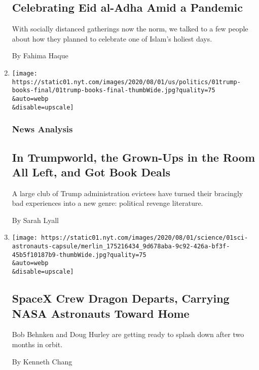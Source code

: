 \begin{enumerate}
  \hypertarget{celebrating-eid-al-adha-amid-a-pandemic-1}{%
  \subsection{Celebrating Eid al-Adha Amid a
  Pandemic}\label{celebrating-eid-al-adha-amid-a-pandemic-1}}

  With socially distanced gatherings now the norm, we talked to a few
  people about how they planned to celebrate one of Islam's holiest
  days.

  By Fahima Haque
\item
  \href{/2020/08/01/us/politics/trump-books.html}{}

  \texttt{[image: https://static01.nyt.com/images/2020/08/01/us/politics/01trump-books-final/01trump-books-final-thumbWide.jpg?quality=75\\\&auto=webp\\\&disable=upscale]}

  \hypertarget{news-analysis}{%
  \subsubsection{News Analysis}\label{news-analysis}}

  \hypertarget{in-trumpworld-the-grown-ups-in-the-room-all-left-and-got-book-deals}{%
  \subsection{In Trumpworld, the Grown-Ups in the Room All Left, and Got
  Book
  Deals}\label{in-trumpworld-the-grown-ups-in-the-room-all-left-and-got-book-deals}}

  A large club of Trump administration evictees have turned their
  bracingly bad experiences into a new genre: political revenge
  literature.

  By Sarah Lyall
\item
  \href{/2020/08/01/science/nasa-spacex-astronauts.html}{}

  \texttt{[image: https://static01.nyt.com/images/2020/08/01/science/01sci-astronauts-capsule/merlin\_175216434\_9d678aba-9c92-426a-bf3f-45b5f10187b9-thumbWide.jpg?quality=75\\\&auto=webp\\\&disable=upscale]}

  \hypertarget{spacex-crew-dragon-departs-carrying-nasa-astronauts-toward-home}{%
  \subsection{SpaceX Crew Dragon Departs, Carrying NASA Astronauts
  Toward
  Home}\label{spacex-crew-dragon-departs-carrying-nasa-astronauts-toward-home}}

  Bob Behnken and Doug Hurley are getting ready to splash down after two
  months in orbit.

  By Kenneth Chang
\end{enumerate}

